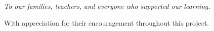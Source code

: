 \vspace*{2cm}
\begin{center}
\large\itshape
To our families, teachers, and everyone who supported our learning.\par
\vspace{1em}
With appreciation for their encouragement throughout this project.
\end{center}
\clearpage
